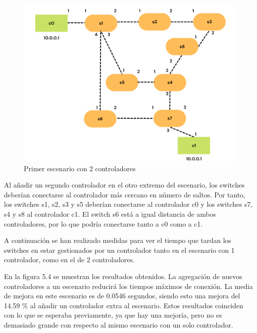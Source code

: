 \documentclass[a4paper, 12pt]{book}
\begin{document}
 	\begin{figure}[H]
 		\centering
 		\includegraphics[width=12cm, keepaspectratio]{img/escenario1-2}
 		\caption{Primer escenario con 2 controladores}
 		\label{figura:escenario1-2c}
 		\vspace{-18pt}
 	\end{figure}
 	
 	 Al añadir un segundo controlador en el otro extremo del escenario, los switches deberían conectarse al controlador más cercano en número de saltos. Por tanto, los switches	 s1, s2, s3 y s5 deberían conectarse al controlador c0 y los switches s7, s4 y s8 al controlador c1. El switch
 	 s6 está a igual distancia de ambos controladores, por lo que podría conectarse tanto a c0 como a c1.
 	 
 	 A continuación se han realizado medidas para ver el tiempo que tardan los switches en estar gestionados por un controlador tanto en el escenario con 1 controlador, como en el de 2 controladores.
 	
 En la figura 5.4 se muestran los resultados obtenidos. La agregación de nuevos controladores a un escenario reducirá los tiempos máximos de conexión. La media de mejora en este escenario es de 0.0546 segundos, siendo esto una mejora del 14.59 \% al añadir un controlador extra al escenario. 
 	Estos resultados coinciden con lo que se esperaba previamente, ya que hay una mejoría, pero no es demasiado grande con respecto al mismo escenario con un solo controlador.
 	
\end{document}
